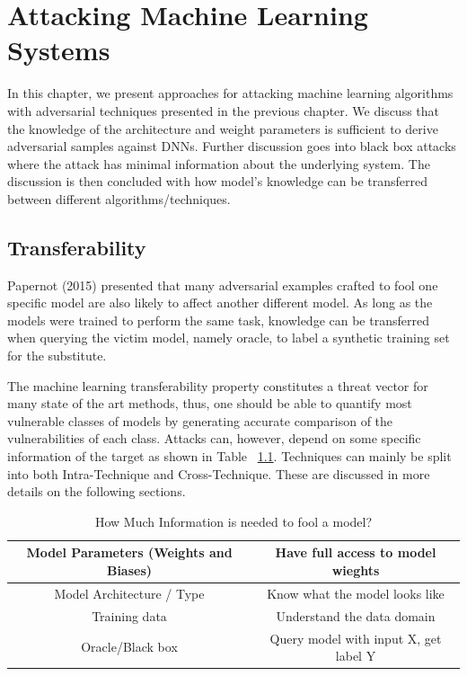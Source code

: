 \chapter{Attacking Machine Learning Systems}

In this chapter, we present approaches for attacking machine learning algorithms with adversarial techniques presented in the previous chapter. We discuss that the knowledge of the architecture and weight parameters is sufficient to derive adversarial samples against DNNs. Further discussion goes into black box attacks where the attack has minimal information about the underlying system. The discussion is then concluded with how model's knowledge can be transferred between different algorithms/techniques.


\section{Transferability}

Papernot (2015) presented that many adversarial examples crafted to fool one specific model are also likely to affect another different model. As long as the models were trained to perform the same task, knowledge can be transferred when querying the victim model, namely oracle, to label a synthetic training set for the substitute.

The machine learning transferability property constitutes a threat vector for many state of the art methods, thus, one should be able to quantify most vulnerable classes of models by generating accurate comparison of the vulnerabilities of each class. Attacks can, however, depend on some specific information of the target as shown in Table ~\ref{tbl:attack_info}. Techniques can mainly be split into both Intra-Technique and Cross-Technique. These are discussed in more details on the following sections.

\vskip 1cm

\begin {table}
\begin{tabular}{|c|c|}
	\hline 
	Model Parameters (Weights and Biases) & Have full access to model wieghts \\ 
	\hline 
	Model Architecture / Type & Know what the model looks like \\ 
	\hline 
	Training data & Understand the data domain \\ 
	\hline 
	Oracle/Black box & Query model with input X, get label Y \\ 
	\hline 
	
\end{tabular} 
\caption {How Much Information is needed to fool a model?}
\label{tbl:attack_info}
\end {table}

